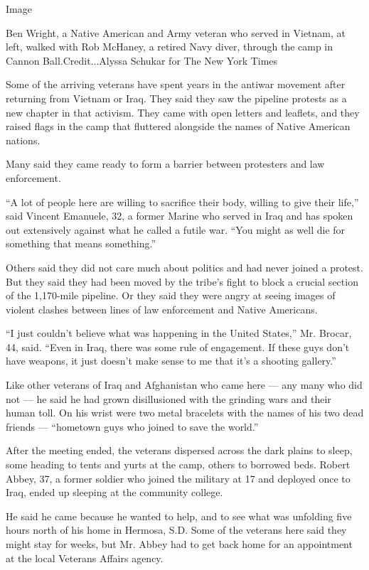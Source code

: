 Image

Ben Wright, a Native American and Army veteran who served in Vietnam, at
left, walked with Rob McHaney, a retired Navy diver, through the camp in
Cannon Ball.Credit...Alyssa Schukar for The New York Times

Some of the arriving veterans have spent years in the antiwar movement
after returning from Vietnam or Iraq. They said they saw the pipeline
protests as a new chapter in that activism. They came with open letters
and leaflets, and they raised flags in the camp that fluttered alongside
the names of Native American nations.

Many said they came ready to form a barrier between protesters and law
enforcement.

``A lot of people here are willing to sacrifice their body, willing to
give their life,'' said Vincent Emanuele, 32, a former Marine who served
in Iraq and has spoken out extensively against what he called a futile
war. ``You might as well die for something that means something.''

Others said they did not care much about politics and had never joined a
protest. But they said they had been moved by the tribe's fight to block
a crucial section of the 1,170-mile pipeline. Or they said they were
angry at seeing images of violent clashes between lines of law
enforcement and Native Americans.

``I just couldn't believe what was happening in the United States,'' Mr.
Brocar, 44, said. ``Even in Iraq, there was some rule of engagement. If
these guys don't have weapons, it just doesn't make sense to me that
it's a shooting gallery.''

Like other veterans of Iraq and Afghanistan who came here --- any many
who did not --- he said he had grown disillusioned with the grinding
wars and their human toll. On his wrist were two metal bracelets with
the names of his two dead friends --- ``hometown guys who joined to save
the world.''

After the meeting ended, the veterans dispersed across the dark plains
to sleep, some heading to tents and yurts at the camp, others to
borrowed beds. Robert Abbey, 37, a former soldier who joined the
military at 17 and deployed once to Iraq, ended up sleeping at the
community college.

He said he came because he wanted to help, and to see what was unfolding
five hours north of his home in Hermosa, S.D. Some of the veterans here
said they might stay for weeks, but Mr. Abbey had to get back home for
an appointment at the local Veterans Affairs agency.

